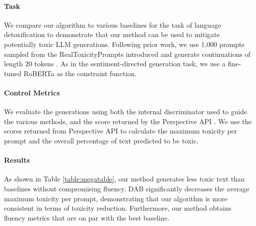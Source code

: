 \paragraph{Task} We compare our algorithm to various baselines for the task of language detoxification to demonstrate that our method can be used to mitigate potentially toxic LLM generations. 
Following prior work, we use 1,000 prompts sampled from the RealToxicityPrompts introduced and generate continuations of length 20 tokens \citep{gehman2020realtoxicitypromptsevaluatingneuraltoxic, kumar2022gradient, liu2023bolt}.
As in the sentiment-directed generation task, we use a fine-tuned RoBERTa as the constraint function. 
\paragraph{Control Metrics} We evaluate the generations using both the internal discriminator used to guide the various methods, and the score returned by the Perspective API \citep{lees2022newgenerationperspectiveapi}. We use the scores returned from Perspective API to calculate the maximum toxicity per prompt and the overall percentage of text predicted to be toxic. 
\paragraph{Results} As shown in Table \ref{table:megatable}, our method generates less toxic text than baselines without compromising fluency. 
DAB significantly decreases the average maximum toxicity per prompt, demonstrating that our algorithm is more consistent in terms of toxicity reduction. 
Furthermore, our method obtains fluency metrics that are on par with the best baseline. 